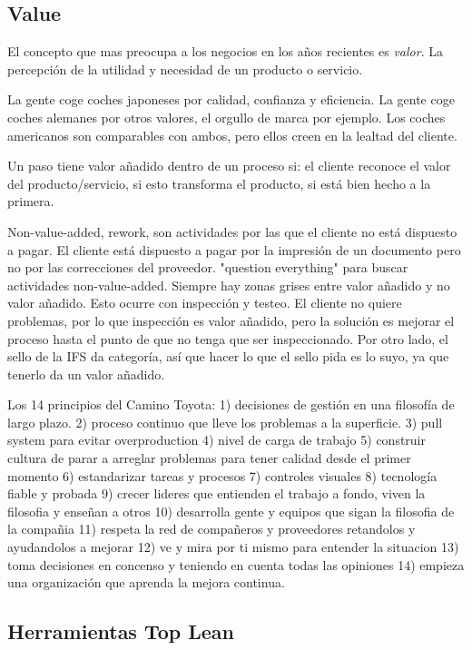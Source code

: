 \documentclass[]{article}
\begin{document}
\subsection{Value}

El concepto que mas preocupa a los negocios en los años recientes es \textit{valor}. La percepción de la utilidad y necesidad de un producto o servicio. 

La gente coge coches japoneses por calidad, confianza y eficiencia. La gente coge coches alemanes por otros valores, el orgullo de marca por ejemplo. Los coches americanos son comparables con ambos, pero ellos creen en la lealtad del cliente. 

Un paso tiene valor añadido dentro de un proceso si: el cliente reconoce el valor del producto/servicio, si esto transforma el producto, si está bien hecho a la primera.

Non-value-added, rework, son actividades por las que el cliente no está dispuesto a pagar. El cliente está dispuesto a pagar por la impresión de un documento pero no por las correcciones del proveedor. "question everything" para buscar actividades non-value-added. Siempre hay zonas grises entre valor añadido y no valor añadido. Esto ocurre con inspección y testeo. El cliente no quiere problemas, por lo que inspección es valor añadido, pero la solución es mejorar el proceso hasta el punto de que no tenga que ser inspeccionado. Por otro lado, el sello de la IFS da categoría, así que hacer lo que el sello pida es lo suyo, ya que tenerlo da un valor añadido.

Los 14 principios del Camino Toyota: 1) decisiones de gestión en una filosofía de largo plazo. 2) proceso continuo que lleve los problemas a la superficie. 3) pull system para evitar overproduction 4) nivel de carga de trabajo 5) construir cultura de parar a arreglar problemas para tener calidad desde el primer momento 6) estandarizar tareas y procesos 7) controles visuales 8) tecnología fiable y probada 9) crecer lideres que entienden el trabajo a fondo, viven la filosofia y enseñan a otros 10) desarrolla gente y equipos que sigan la filosofia de la compañia 11) respeta la red de compañeros y proveedores retandolos y ayudandolos a mejorar 12) ve y mira por ti mismo para entender la situacion 13) toma decisiones en concenso y teniendo en cuenta todas las opiniones 14) empieza una organización que aprenda la mejora continua.

\subsection{Herramientas Top Lean}
\end{document}
